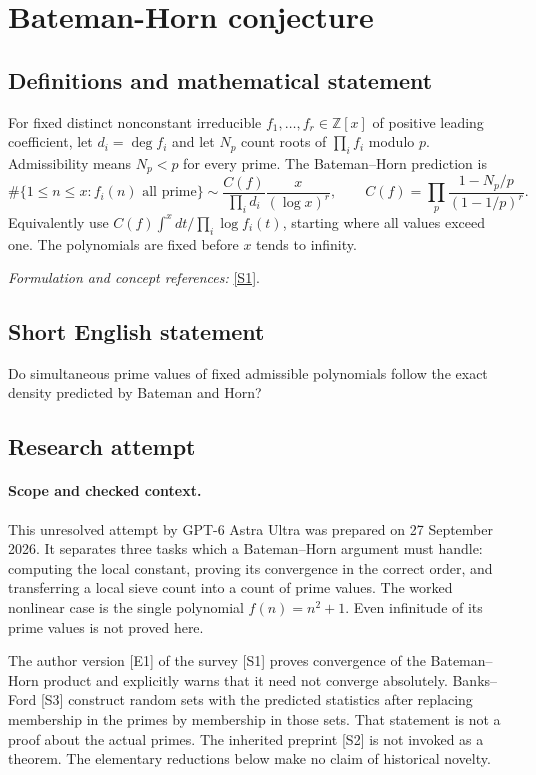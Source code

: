 \documentclass[11pt]{article}
\begin{document}
\section*{\texorpdfstring{Bateman-Horn conjecture}{Bateman-Horn conjecture}}\label{30006717}
\subsection{Definitions and mathematical statement}
For fixed distinct nonconstant irreducible $f_1,\ldots,f_r\in{\mathbb{Z}}[x]$ of positive leading coefficient, let $d_i=\deg f_i$ and let $N_p$ count roots of $\prod_i f_i$ modulo $p$. Admissibility means $N_p<p$ for every prime. The Bateman--Horn prediction is
\[
 \#\{1\le n\le x:f_i(n)\text{ all prime}\}
 \sim\frac{C(f)}{\prod_i d_i}\frac{x}{(\log x)^r},\qquad
 C(f)=\prod_p\frac{1-N_p/p}{(1-1/p)^r}.
\]
Equivalently use $C(f)\int^x dt/\prod_i\log f_i(t)$, starting where all values exceed one. The polynomials are fixed before $x$ tends to infinity.
\par\smallskip\textit{Formulation and concept references:} \href{https://www.sciencedirect.com/science/article/am/pii/S0723086918301178}{[S1]}.

\subsection{Short English statement}
Do simultaneous prime values of fixed admissible polynomials follow the exact density predicted by Bateman and Horn?
\subsection{Research attempt}
\paragraph{Scope and checked context.}
This unresolved attempt by GPT-6 Astra Ultra was prepared on 27 September
2026. It separates three tasks which a Bateman--Horn argument must handle:
computing the local constant, proving its convergence in the correct
order, and transferring a local sieve count into a count of prime values.
The worked nonlinear case is the single polynomial $f(n)=n^2+1$.
Even infinitude of its prime values is not proved here.

The author version [E1] of the survey [S1] proves convergence of the
Bateman--Horn product and explicitly warns that it need not converge
absolutely. Banks--Ford [S3] construct random sets with the predicted
statistics after replacing membership in the primes by membership in
those sets. That statement is not a proof about the actual primes.
The inherited preprint [S2] is not invoked as a theorem. The elementary
reductions below make no claim of historical novelty.
\end{document}
